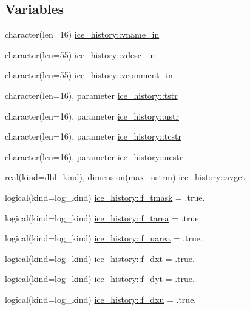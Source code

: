 \subsection*{Variables}
\begin{DoxyCompactItemize}
\item 
character(len=16) \hyperlink{namespaceice__history_a795d9a5379207bc00848c3d58be6fac2}{ice\_\-history::vname\_\-in}
\item 
character(len=55) \hyperlink{namespaceice__history_a000ee3af05f02fbff13085400a751e53}{ice\_\-history::vdesc\_\-in}
\item 
character(len=55) \hyperlink{namespaceice__history_ab6f7ee9f2623bb2e08b57018462544df}{ice\_\-history::vcomment\_\-in}
\item 
character(len=16), parameter \hyperlink{namespaceice__history_ab16190577859fe12663ca28b0690e5ec}{ice\_\-history::tstr}
\item 
character(len=16), parameter \hyperlink{namespaceice__history_a2b8d89b4e6bf73f99efde8b74906cef9}{ice\_\-history::ustr}
\item 
character(len=16), parameter \hyperlink{namespaceice__history_a56409d6f67844894d11f17ca553864bf}{ice\_\-history::tcstr}
\item 
character(len=16), parameter \hyperlink{namespaceice__history_a6d6a4603e818d63fe00df57441c0a5fb}{ice\_\-history::ucstr}
\item 
real(kind=dbl\_\-kind), dimension(max\_\-nstrm) \hyperlink{namespaceice__history_a8f63bda9e9e4d0a76e49e17002210ae4}{ice\_\-history::avgct}
\item 
logical(kind=log\_\-kind) \hyperlink{namespaceice__history_ac6635a8bcde54a554d4b60c7c6566b26}{ice\_\-history::f\_\-tmask} = .true.
\item 
logical(kind=log\_\-kind) \hyperlink{namespaceice__history_a7b8cc0a9e56bbe22f0015aa2062953d0}{ice\_\-history::f\_\-tarea} = .true.
\item 
logical(kind=log\_\-kind) \hyperlink{namespaceice__history_ac39fd46be06edb447fb96f16103e4d96}{ice\_\-history::f\_\-uarea} = .true.
\item 
logical(kind=log\_\-kind) \hyperlink{namespaceice__history_a6effc6ebe9b5dc7d958341622f11530c}{ice\_\-history::f\_\-dxt} = .true.
\item 
logical(kind=log\_\-kind) \hyperlink{namespaceice__history_a7976eedce7471cfcf14fe54b09e5e2a0}{ice\_\-history::f\_\-dyt} = .true.
\item 
logical(kind=log\_\-kind) \hyperlink{namespaceice__history_ac2cca9bb022f44a98a6cff9a59cd19e3}{ice\_\-history::f\_\-dxu} = .true.

\end{DoxyCompactItemize}

